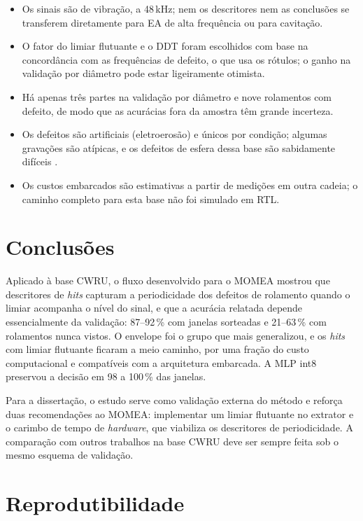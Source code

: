 \documentclass[12pt]{article}
\begin{document}
\begin{itemize}
	\item Os sinais são de vibração, a 48\,kHz; nem os descritores nem as conclusões se transferem diretamente para EA de alta frequência ou para cavitação.
	\item O fator do limiar flutuante e o DDT foram escolhidos com base na concordância com as frequências de defeito, o que usa os rótulos; o ganho na validação por diâmetro pode estar ligeiramente otimista.
	\item Há apenas três partes na validação por diâmetro e nove rolamentos com defeito, de modo que as acurácias fora da amostra têm grande incerteza.
	\item Os defeitos são artificiais (eletroerosão) e únicos por condição; algumas gravações são atípicas, e os defeitos de esfera dessa base são sabidamente difíceis \cite{smith2015}.
	\item Os custos embarcados são estimativas a partir de medições em outra cadeia; o caminho completo para esta base não foi simulado em RTL.
\end{itemize}

\section{Conclusões}
\label{sec:conclusoes}

Aplicado à base CWRU, o fluxo desenvolvido para o MOMEA mostrou que descritores de \textit{hits} capturam a periodicidade dos defeitos de rolamento quando o limiar acompanha o nível do sinal, e que a acurácia relatada depende essencialmente da validação: 87--92\,\% com janelas sorteadas e 21--63\,\% com rolamentos nunca vistos. O envelope foi o grupo que mais generalizou, e os \textit{hits} com limiar flutuante ficaram a meio caminho, por uma fração do custo computacional e compatíveis com a arquitetura embarcada. A MLP int8 preservou a decisão em 98 a 100\,\% das janelas.

Para a dissertação, o estudo serve como validação externa do método e reforça duas recomendações ao MOMEA: implementar um limiar flutuante no extrator e o carimbo de tempo de \textit{hardware}, que viabiliza os descritores de periodicidade. A comparação com outros trabalhos na base CWRU deve ser sempre feita sob o mesmo esquema de validação.

\section*{Reprodutibilidade}
\end{document}
